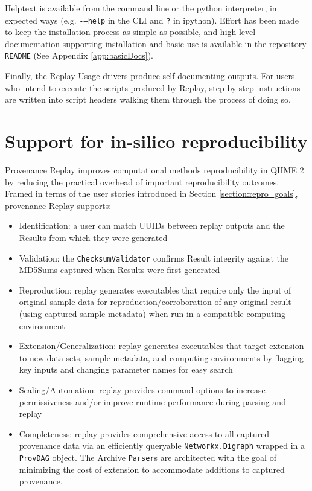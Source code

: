 Helptext is available from the command line or the python interpreter, in
expected ways (e.g. \texttt{-–help} in the CLI and \texttt{?} in ipython).
Effort has been made to keep the installation process as simple as possible, and
high-level documentation supporting installation and basic use is available in
the repository \texttt{README} (See Appendix \ref{app:basicDocs}).

Finally, the Replay Usage drivers produce self-documenting outputs. For users
who intend to execute the scripts produced by Replay, step-by-step instructions
are written into script headers walking them through the process of doing so.


\section{Support for in-silico reproducibility}

Provenance Replay improves computational methods reproducibility in QIIME 2 by
reducing the practical overhead of important reproducibility outcomes. Framed in
terms of the user stories introduced in Section \ref{section:repro_goals},
provenance Replay supports:

\begin{itemize}
    \item Identification: a user can match UUIDs between replay outputs and the
        Results from which they were generated
    \item Validation: the \texttt{ChecksumValidator} confirms Result integrity
        against the MD5Sums captured when Results were first generated
    \item Reproduction: replay generates executables that require only the input
        of original sample data for reproduction/corroboration of any original
        result (using captured sample metadata) when run in a compatible computing
        environment
    \item Extension/Generalization: replay generates executables that target
        extension to new data sets, sample metadata, and computing environments by
        flagging key inputs and changing parameter names for easy search
    \item Scaling/Automation: replay provides command options to increase
        permissiveness and/or improve runtime performance during parsing and replay
    \item Completeness: replay provides comprehensive access to all captured
        provenance data via an efficiently queryable \texttt{Networkx.Digraph}
        wrapped in a \texttt{ProvDAG} object. The Archive \texttt{Parser}s are architected
        with the goal of minimizing the cost of extension to accommodate additions
        to captured provenance.
\end{itemize}

